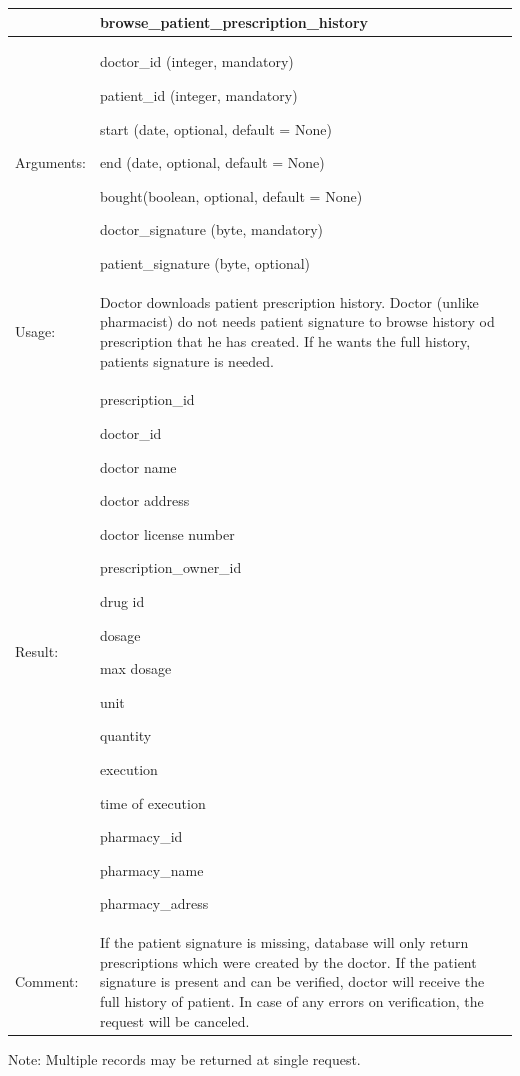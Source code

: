     \begin{longtable}{| p{3cm} | p{10.75cm} |}
    \hline
     & browse\_patient\_prescription\_history \\ \hline
    Arguments: &  \begin{packed_enum}
    	\item doctor\_id (integer, mandatory)
		\item patient\_id (integer, mandatory)
		\item start (date, optional, default = None)
		\item end (date, optional, default = None)
		\item bought(boolean, optional, default = None)
		\item doctor\_signature (byte, mandatory)
		\item patient\_signature (byte, optional)

	\end{packed_enum}     \\ \hline
    Usage: & Doctor downloads patient prescription history. Doctor (unlike pharmacist) do not needs patient signature to browse history od prescription that he has created. If he wants the full history, patients signature is needed. \\ \hline
    Result: & \begin{packed_enum}
    	\item prescription\_id
    	\item doctor\_id
    	\item doctor name
    	\item doctor address
    	\item doctor license number
    	\item prescription\_owner\_id
    	\item drug id
    	\item dosage
    	\item max dosage
    	\item unit
    	\item quantity
    	\item execution
    	\item time of execution
    	\item pharmacy\_id
    	\item pharmacy\_name
    	\item pharmacy\_adress
	\end{packed_enum}     \\ \hline
	Comment: & If the patient signature is missing, database will only return prescriptions which were created by the doctor. If the patient signature is present and can be verified, doctor will receive the full history of patient. In case of any errors on verification, the request will be canceled. \\ \hline
    \end{longtable}
Note: Multiple records may be returned at single request.

